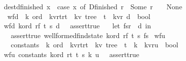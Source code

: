 \begin{isabellebody}
{\isachardoublequoteopen}dest{\isacharunderscore}d{\isacharunderscore}finished\ x\ {\isacharequal}\ {\isacharparenleft}case\ x\ of\ D{\isacharunderscore}finished\ r\ {\isasymRightarrow}\ Some\ r\ {\isacharbar}\ {\isacharunderscore}\ {\isasymRightarrow}\ None{\isacharparenright}{\isachardoublequoteclose}\isanewline
\isanewline
\isanewline
\isanewline
{}\isamarkupfalse%
\ wf{\isacharunderscore}d\ {\isacharcolon}{\isacharcolon}\ {\isachardoublequoteopen}{\isacharprime}k\ ord\ {\isasymRightarrow}\ {\isacharparenleft}{\isacharprime}k{\isacharcomma}{\isacharprime}v{\isacharcomma}{\isacharprime}r{\isacharcomma}{\isacharprime}t{\isacharparenright}r{}t\ {\isasymRightarrow}\ {\isacharparenleft}{\isacharprime}k{\isacharcomma}{\isacharprime}v{\isacharparenright}\ tree\ {\isasymRightarrow}\ {\isacharprime}t\ {\isasymRightarrow}\ {\isacharparenleft}{\isacharprime}k{\isacharcomma}{\isacharprime}v{\isacharcomma}{\isacharprime}r{\isacharparenright}\ d\ {\isasymRightarrow}\ bool{\isachardoublequoteclose}\ \isanewline
{\isachardoublequoteopen}wf{\isacharunderscore}d\ k{\isacharunderscore}ord\ r{}f\ t{}\ s\ d\ {\isacharequal}\ \ assert{\isacharunderscore}true\ {\isacharparenleft}\isanewline
\ \ let\ {\isacharparenleft}fs{\isacharcomma}r{\isacharparenright}\ {\isacharequal}\ d\ in\isanewline
\ \ assert{\isacharunderscore}true\ {\isacharparenleft}wellformed{\isacharunderscore}find{\isacharunderscore}state\ k{\isacharunderscore}ord\ r{}f\ t{}\ s\ fs{\isacharparenright}\isanewline
{\isacharparenright}{\isachardoublequoteclose}\isanewline
\isanewline
{}\isamarkupfalse%
\ wf{\isacharunderscore}u\ {\isacharcolon}{\isacharcolon}\ \isanewline
\ \ {\isachardoublequoteopen}constants\ {\isasymRightarrow}\ {\isacharprime}k\ ord\ {\isasymRightarrow}\ {\isacharparenleft}{\isacharprime}k{\isacharcomma}{\isacharprime}v{\isacharcomma}{\isacharprime}r{\isacharcomma}{\isacharprime}t{\isacharparenright}r{}t\ {\isasymRightarrow}\ {\isacharparenleft}{\isacharprime}k{\isacharcomma}{\isacharprime}v{\isacharparenright}\ tree\ {\isasymRightarrow}\ {\isacharprime}t\ {\isasymRightarrow}\ {\isacharprime}k\ {\isasymRightarrow}\ {\isacharparenleft}{\isacharprime}k{\isacharcomma}{\isacharprime}v{\isacharcomma}{\isacharprime}r{\isacharparenright}u\ {\isasymRightarrow}\ bool{\isachardoublequoteclose}\ \isanewline
{}\isanewline
{\isachardoublequoteopen}wf{\isacharunderscore}u\ constants\ k{\isacharunderscore}ord\ r{}t\ t{}\ s\ k\ u\ {\isacharequal}\ \ assert{\isacharunderscore}true\ {\isacharparenleft}\isanewline

\end{isabellebody}
